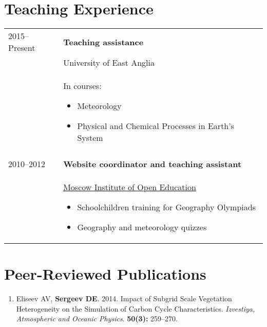 \documentclass[a4paper,11pt]{article}
\makeatletter
\newlength{\mycol}
\newlength{\bibhang}
\newlength{\bibsep}
 {\@listi \global\bibsep\itemsep \global\advance\bibsep by\parsep}
\newenvironment{bibsection}%
        {\begin{enumerate}{}{%
       \setlength{\leftmargin}{\bibhang}%
       \setlength{\itemindent}{-\leftmargin}%
       \setlength{\itemsep}{\bibsep}%
       \setlength{\parsep}{\z@}%
        \setlength{\partopsep}{0pt}%
        \setlength{\topsep}{0pt}}}
        {\end{enumerate}\vspace{-.6\baselineskip}}
\makeatother
\begin{document}
\section{Teaching Experience}
\begin{tabu} to 
2015--\small{Present} & \textbf{Teaching assistance} \\
& University of East Anglia \\
& In courses: 
\begin{itemize}
\item Meteorology
\item Physical and Chemical Processes in Earth's System
\end{itemize} \\
 \\

2010--2012 & \textbf{Website coordinator and teaching assistant} \\
& \href{http://www.mioo.ru/}{Moscow Institute of Open Education} 
\begin{itemize}
\item Schoolchildren training for Geography Olympiads
\item Geography and meteorology quizzes
\end{itemize}
\end{tabu}

\section{Peer-Reviewed Publications}
\begin{bibsection}
    \item Eliseev AV, {\bf Sergeev DE}. 2014. Impact of Subgrid Scale Vegetation Heterogeneity on the Simulation of Carbon Cycle Characteristics. \emph{Izvestiya, Atmospheric and Oceanic Physics}. \textbf{50(3):} 259--270.
\end{bibsection}
\end{document}
